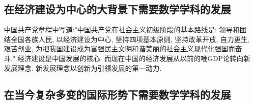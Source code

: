 \subsection{在经济建设为中心的大背景下需要数学学科的发展}

中国共产党章程中写道:"中国共产党在社会主义初级阶段的基本路线是: 领导和团结全国各族人民, 以经济建设为中心, 坚持四项基本原则, 坚持改革开放, 自力更生, 艰苦创业, 为把我国建设成为富强民主文明和谐美丽的社会主义现代化强国而奋斗." %
经济建设是中国发展的核心. 而现在中国的经济发展从以前的唯GDP论转向新发展理念. 新发展理念以创新为引领发展的第一动力.


\subsection{在当今复杂多变的国际形势下需要数学学科的发展}

